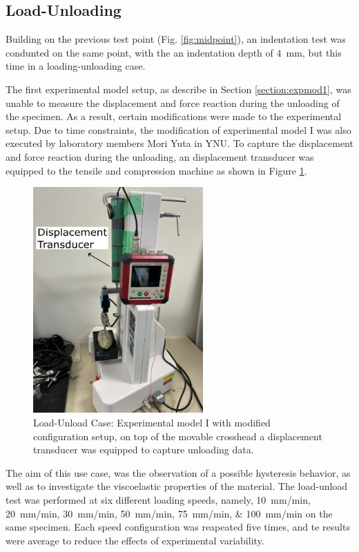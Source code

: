 \subsection{Load-Unloading}
\label{subsection:loadunload}
Building on the previous test point (Fig. \ref{fig:midpoint}), an indentation
 test was condunted on the same point, with the an indentation depth of 
 \SI{4}{\milli \m}, but this time in a loading-unloading case.

The first experimental model setup, as describe in Section \ref{section:expmod1},
was unable to measure the displacement and force reaction during the unloading 
of the specimen. As a result, certain modifications were made to the experimental 
setup. Due to time constraints, the modification of experimental model I 
was also executed by laboratory members Mori Yuta in YNU.
To capture the displacement and force reaction during the unloading, an 
displacement transducer was equipped to the tensile and compression machine 
as shown in Figure \ref{fig:unloadingexp1}.

\begin{figure}%
    \centering
   \quad
   \includegraphics[width=6.5cm]{Images/Experiment/unloading.png}%
   \caption{Load-Unload Case: Experimental model I with modified configuration setup, on top of the movable crosshead a displacement transducer was equipped to capture unloading data.}%
   \label{fig:unloadingexp1}%
\end{figure}
 
The aim of this use case, was the observation of a possible hysteresis
behavior, as well as to investigate the viscoelastic properties of the material.
The load-unload test was performed at six different loading speeds, namely, 
\SIlist[per-mode = symbol]{10;20;30;50;75;100}{\milli \metre \per \minute} on the 
same specimen.
Each speed configuration was reapeated five times, and te results were average to 
reduce the effects of experimental variability.\\

